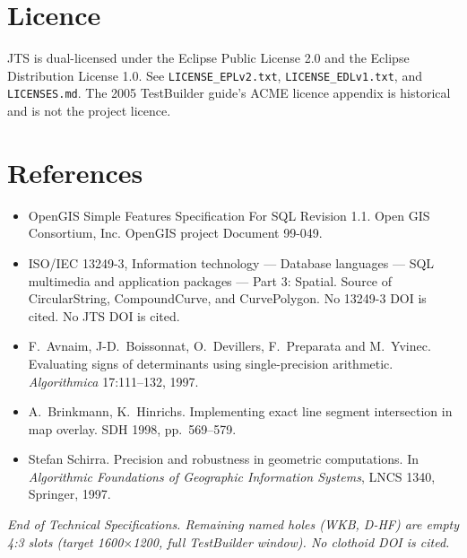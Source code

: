 \documentclass[11pt]{article}
\begin{document}

\section{Licence}
JTS is dual-licensed under the Eclipse Public License 2.0 and the
Eclipse Distribution License 1.0. See \texttt{LICENSE\_EPLv2.txt},
\texttt{LICENSE\_EDLv1.txt}, and \texttt{LICENSES.md}. The 2005
TestBuilder guide's ACME licence appendix is historical and is not
the project licence.

\section{References}
\begin{itemize}
  \item [SFS] OpenGIS Simple Features Specification For SQL
        Revision 1.1. Open GIS Consortium, Inc. OpenGIS project
        Document 99-049.
  \item [SQL/MM] ISO/IEC 13249-3, Information technology ---
        Database languages --- SQL multimedia and application
        packages --- Part 3: Spatial. Source of CircularString,
        CompoundCurve, and CurvePolygon. No 13249-3 DOI is cited.
        No JTS DOI is cited.
  \item [Ava97] F.\ Avnaim, J-D.\ Boissonnat, O.\ Devillers,
        F.\ Preparata and M.\ Yvinec. Evaluating signs of
        determinants using single-precision arithmetic.
        \emph{Algorithmica} 17:111--132, 1997.
  \item [Bri98] A.\ Brinkmann, K.\ Hinrichs. Implementing exact line
        segment intersection in map overlay. SDH 1998, pp.\ 569--579.
  \item [Sch97] Stefan Schirra. Precision and robustness in geometric
        computations. In \emph{Algorithmic Foundations of Geographic
        Information Systems}, LNCS 1340, Springer, 1997.
\end{itemize}

\vspace{1.2em}
\noindent\textit{End of Technical Specifications. Remaining named
holes (WKB, D-HF) are empty 4:3 slots (target 1600$\times$1200,
full TestBuilder window). No clothoid DOI is cited.}
\end{document}
